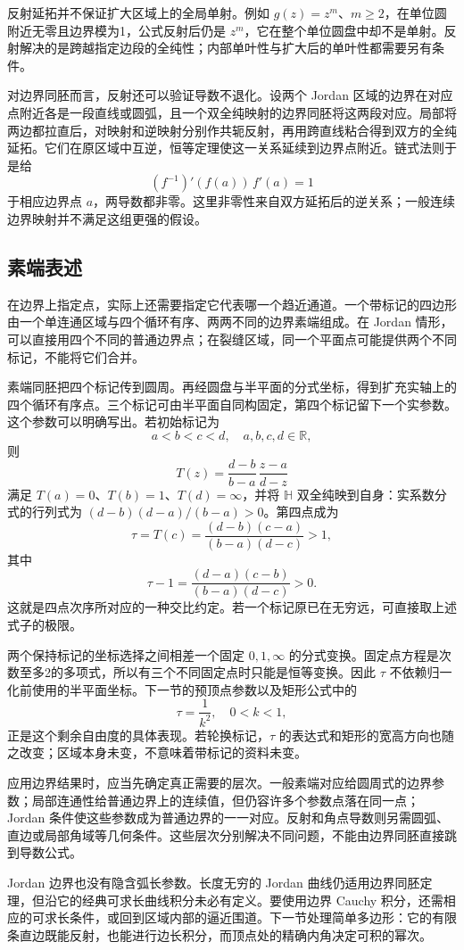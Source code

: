 反射延拓并不保证扩大区域上的全局单射。例如 \(g(z)=z^m\)、\(m\ge2\)，在单位圆附近无零且边界模为1，公式反射后仍是 \(z^m\)，它在整个单位圆盘中却不是单射。反射解决的是跨越指定边段的全纯性；内部单叶性与扩大后的单叶性都需要另有条件。

\ProseParagraphBreak

对边界同胚而言，反射还可以验证导数不退化。设两个 Jordan 区域的边界在对应点附近各是一段直线或圆弧，且一个双全纯映射的边界同胚将这两段对应。局部将两边都拉直后，对映射和逆映射分别作共轭反射，再用跨直线粘合得到双方的全纯延拓。它们在原区域中互逆，恒等定理使这一关系延续到边界点附近。链式法则于是给
\[
 (f^{-1})'(f(a))\,f'(a)=1
\]
于相应边界点 \(a\)，两导数都非零。这里非零性来自双方延拓后的逆关系；一般连续边界映射并不满足这组更强的假设。

\subsection{素端表述}
\label{b3:subsec:070204}

在边界上指定点，实际上还需要指定它代表哪一个趋近通道。一个带标记的四边形由一个单连通区域与四个循环有序、两两不同的边界素端组成。在 Jordan 情形，可以直接用四个不同的普通边界点；在裂缝区域，同一个平面点可能提供两个不同标记，不能将它们合并。

\ProseParagraphBreak

素端同胚把四个标记传到圆周。再经圆盘与半平面的分式坐标，得到扩充实轴上的四个循环有序点。三个标记可由半平面自同构固定，第四个标记留下一个实参数。这个参数可以明确写出。若初始标记为
\[
 a<b<c<d,\quad a,b,c,d\in\mathbb R,
\]
则
\[
 T(z)=\frac{d-b}{b-a}\,\frac{z-a}{d-z}
\]
满足 \(T(a)=0\)、\(T(b)=1\)、\(T(d)=\infty\)，并将 \(\mathbb H\) 双全纯映到自身：实系数分式的行列式为
\((d-b)(d-a)/(b-a)>0\)。第四点成为
\[
 \tau=T(c)=\frac{(d-b)(c-a)}{(b-a)(d-c)}>1,
\]
其中
\[
 \tau-1=\frac{(d-a)(c-b)}{(b-a)(d-c)}>0.
\]
这就是四点次序所对应的一种交比约定。若一个标记原已在无穷远，可直接取上述式子的极限。

\ProseParagraphBreak

两个保持标记的坐标选择之间相差一个固定 \(0,1,\infty\) 的分式变换。固定点方程是次数至多2的多项式，所以有三个不同固定点时只能是恒等变换。因此 \(\tau\) 不依赖归一化前使用的半平面坐标。下一节的预顶点参数以及矩形公式中的
\[
 \tau=\frac1{k^2},\quad 0<k<1,
\]
正是这个剩余自由度的具体表现。若轮换标记，\(\tau\) 的表达式和矩形的宽高方向也随之改变；区域本身未变，不意味着带标记的资料未变。

\ProseParagraphBreak

应用边界结果时，应当先确定真正需要的层次。一般素端对应给圆周式的边界参数；局部连通性给普通边界上的连续值，但仍容许多个参数点落在同一点；Jordan 条件使这些参数成为普通边界的一一对应。反射和角点导数则另需圆弧、直边或局部角域等几何条件。这些层次分别解决不同问题，不能由边界同胚直接跳到导数公式。

\ProseParagraphBreak

Jordan 边界也没有隐含弧长参数。长度无穷的 Jordan 曲线仍适用边界同胚定理，但沿它的经典可求长曲线积分未必有定义。要使用边界 Cauchy 积分，还需相应的可求长条件，或回到区域内部的逼近围道。下一节处理简单多边形：它的有限条直边既能反射，也能进行边长积分，而顶点处的精确内角决定可积的幂次。
